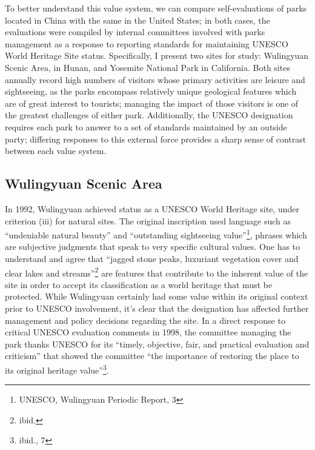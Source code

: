 To better understand this value system, we can compare self-evaluations of parks
located in China with the same in the United States; in both cases, the
evaluations were compiled by internal committees involved with parks management
as a response to reporting standards for maintaining UNESCO World Heritage Site
status. Specifically, I present two sites for study: Wulingyuan Scenic Area, in
Hunan, and Yosemite National Park in California. Both sites annually record high
numbers of visitors whose primary activities are leisure and sightseeing, as the
parks encompass relatively unique geological features which are of great
interest to tourists; managing the impact of those visitors is one of the
greatest challenges of either park. Additionally, the UNESCO designation
requires each park to answer to a set of standards maintained by an outside
party; differing responses to this external force provides a sharp sense of
contrast between each value system.

\subsection*{Wulingyuan Scenic Area}

In 1992, Wulingyuan achieved status as a UNESCO World Heritage site, under
criterion (iii) for natural sites. The original inscription used language such
as ``undeniable natural beauty'' and ``outstanding sightseeing
value''\footnote{UNESCO, Wulingyuan Periodic Report, 3}, phrases which are
subjective judgments that speak to very specific cultural values. One has to
understand and agree that ``jagged stone peaks, luxuriant vegetation cover and
clear lakes and streams''\footnote{ibid.} are features that contribute to the
inherent value of the site in order to accept its classification as a world
heritage that must be protected. While Wulingyuan certainly had some value
within its original context prior to UNESCO involvement, it's clear that the
designation has affected further management and policy decisions regarding the
site. In a direct response to critical UNESCO evaluation comments in 1998, the
committee managing the park thanks UNESCO for its ``timely, objective, fair, and
practical evaluation and criticism'' that showed the committee ``the importance
of restoring the place to its original heritage value''\footnote{ibid., 7}.

